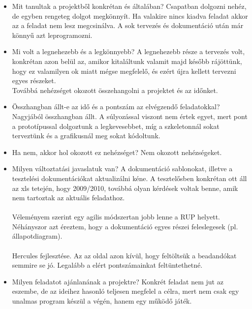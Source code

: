 \begin{itemize}
\item Mit tanultak a projektből konkrétan és általában? \newline
Csapatban dolgozni nehéz, de egyben rengeteg dolgot megkönnyít. Ha valakire nincs kiadva feladat akkor az a feladat nem lesz megcsinálva. 
A sok tervezés és dokumentáció után már könnyű azt leprogramozni.
\item Mi volt a legnehezebb és a legkönnyebb? \newline
A legnehezebb része a tervezés volt, konkrétan azon belül az, amikor kitaláltunk valamit majd később rájöttünk, hogy ez valamilyen ok miatt mégse megfelelő, és ezért újra kellett tervezni egyes részeket.\\
Továbbá nehézséget okozott összehangolni a projektet és az időnket.
\item Összhangban állt-e az idő és a pontszám az elvégzendő feladatokkal? \newline
Nagyjából összhangban állt. A súlyozással viszont nem értek egyet, mert pont a prototípussal dolgoztunk a legkevesebbet, míg a szkeletonnál sokat terveztünk és a grafikusnál meg sokat kódoltunk.\\
\item Ha nem, akkor hol okozott ez nehézséget? \newline
Nem okozott nehézségeket.
\item Milyen változtatási javaslatuk van? \newline
A dokumentáció sablonokat, illetve a tesztelési dokumentációkat aktualizálni kéne. A tesztelősben konkrétan ott áll az xls tetején, hogy 2009/2010, továbbá olyan kérdések voltak benne, amik nem tartoztak az aktuális feladathoz.\\\\
Véleményem szerint egy agilis módszertan jobb lenne a RUP helyett. Néhányszor azt éreztem, hogy a dokumentáció egyes részei feleslegesek (pl. állapotdiagram).\\\\
Hercules fejlesztése. Az az oldal azon kívül, hogy feltöltsük a beadandókat semmire se jó. Legalább a elért pontszámainkat feltüntethetné.
\item Milyen feladatot ajánlanának a projektre? \newline
Konkrét feladat nem jut az eszembe, de az ideihez hasonló teljesen megfelel a célra, mert nem csak egy unalmas program készül a végén, hanem egy működő játék.

\end{itemize}


